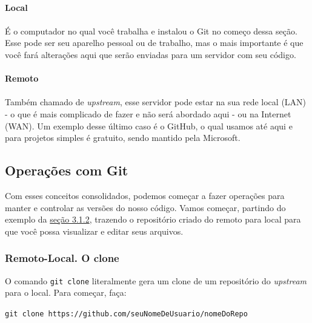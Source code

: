 \documentclass{article}
\begin{document}
  \paragraph{Local}
  \paragraph{}

  É o computador no qual você trabalha e instalou o Git no começo dessa seção. Esse pode ser seu aparelho pessoal ou 
  de trabalho, mas o mais importante é que você fará alterações aqui que serão enviadas para um servidor com seu código.

  \paragraph{Remoto}
  \paragraph{}

  Também chamado de \textit{upstream}, esse servidor pode estar na sua rede local (LAN) - o que é mais complicado de fazer e não será abordado aqui - ou na
  Internet (WAN). Um exemplo desse último caso é o GitHub, o qual usamos até aqui e para projetos simples é gratuito, sendo 
  mantido pela Microsoft. 

  \subsection{Operações com Git}

  Com esses conceitos consolidados, podemos começar a fazer operações para manter e controlar as versões do nosso código.
  Vamos começar, partindo do exemplo da \href{sec:branches}{seção 3.1.2}, trazendo o repositório criado do remoto para local para que você possa
  visualizar e editar seus arquivos. 

  \subsubsection{Remoto-Local. O clone}

  O comando \texttt{git clone} literalmente gera um clone de um repositório do \textit{upstream} para o local. Para começar, faça:
  
  \vspace{1ex}
  \texttt{git clone https://github.com/seuNomeDeUsuario/nomeDoRepo}
  \vspace{1ex}
  
\end{document}

